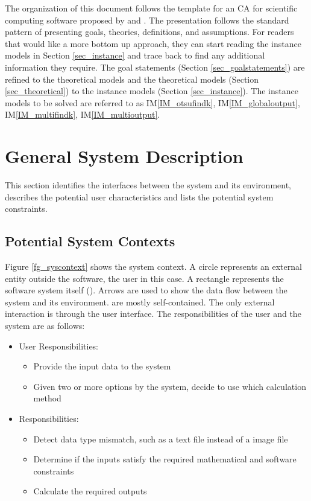 \documentclass[12pt]{article}
\newcommand{\iref}[1]{IM\ref{#1}}
\begin{document}
The organization of this document follows the template for an CA for scientific computing software proposed by \cite{Parnas1972} and \cite{ParnasAndClements1986}. The presentation follows the standard pattern of presenting goals, theories, definitions, and assumptions. For readers that would like a more bottom up approach, they can start reading the instance
models in Section \ref{sec_instance} and trace back to find any additional information they require.
The goal statements (Section \ref{sec_goalstatements}) are refined to the theoretical models and the theoretical models (Section \ref{sec_theoretical}) to the instance models (Section \ref{sec_instance}). The instance models to be solved are referred to as \iref{IM_otsufindk}, \iref{IM_globaloutput}, \iref{IM_multifindk}, \iref{IM_multioutput}.

\section{General System Description}

This section identifies the interfaces between the system and its environment,
describes the potential user characteristics and lists the potential system
constraints.

\subsection{Potential System Contexts}

Figure \ref{fg_syscontext} shows the system context. A circle represents an external entity outside the software, the user in this case. A rectangle represents the software system itself (\famname).
Arrows are used to show the data flow between the system and its environment.
\famname{} are mostly self-contained. The only external interaction is through the user interface. The responsibilities of the user and the system are as follows:

\begin{itemize}
\item User Responsibilities:
\begin{itemize}
\item Provide the input data to the system
\item Given two or more options by the system, decide to use which calculation method
\end{itemize}
\item \famname{} Responsibilities:
\begin{itemize}
\item Detect data type mismatch, such as a text file instead of a image file
\item Determine if the inputs satisfy the required mathematical and software constraints
\item Calculate the required outputs
\end{itemize}
\end{itemize}
\end{document}
